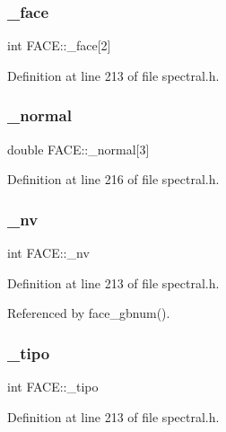 \subsubsection{\texorpdfstring{\+\_\+face}{\_face}}
{\footnotesize\ttfamily int F\+A\+C\+E\+::\+\_\+face\mbox{[}2\mbox{]}}



Definition at line 213 of file spectral.\+h.

\mbox{\label{structFACE_ae3e59914e6ad07eb003a732ad7905313}} 
\subsubsection{\texorpdfstring{\+\_\+normal}{\_normal}}
{\footnotesize\ttfamily double F\+A\+C\+E\+::\+\_\+normal\mbox{[}3\mbox{]}}



Definition at line 216 of file spectral.\+h.

\mbox{\label{structFACE_a26e0cd25d7a18046b6a80f0815246667}} 
\subsubsection{\texorpdfstring{\+\_\+nv}{\_nv}}
{\footnotesize\ttfamily int F\+A\+C\+E\+::\+\_\+nv}



Definition at line 213 of file spectral.\+h.



Referenced by face\+\_\+gbnum().

\mbox{\label{structFACE_aa7ed87f6d16ef69445c966c26b9044ff}} 
\subsubsection{\texorpdfstring{\+\_\+tipo}{\_tipo}}
{\footnotesize\ttfamily int F\+A\+C\+E\+::\+\_\+tipo}



Definition at line 213 of file spectral.\+h.



